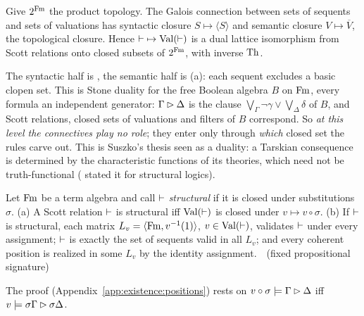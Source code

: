 \begin{theorem}\label{thm:existence:duality}
Give $2^{\mathrm{Fm}}$ the product topology. The Galois connection between sets of sequents and sets of valuations has syntactic closure $S\mapsto\langle S\rangle$ and semantic closure $V\mapsto\overline V$, the topological closure. Hence ${\vdash}\mapsto\mathrm{Val}(\vdash)$ is a dual lattice isomorphism from Scott relations onto closed subsets of $2^{\mathrm{Fm}}$, with inverse $\mathrm{Th}$.
\hfill{}\ 
\end{theorem}

The syntactic half is , the semantic half is (a): each sequent excludes a basic clopen set. This is Stone duality \citep{stone1936theory} for the free Boolean algebra $B$ on $\mathrm{Fm}$, every formula an independent generator: $\Gamma\rhd\Delta$ is the clause $\bigvee_\Gamma\neg\gamma\vee\bigvee_\Delta\delta$ of $B$, and Scott relations, closed sets of valuations and filters of $B$ correspond. So \emph{at this level the connectives play no role}; they enter only through \emph{which} closed set the rules carve out. This is Suszko's thesis seen as a duality: a Tarskian consequence is determined by the characteristic functions of its theories, which need not be truth-functional (\citealt{suszko1977fregean} stated it for structural logics).

\begin{theorem}\label{thm:existence:structural}
Let $\mathrm{Fm}$ be a term algebra and call ${\vdash}$ \emph{structural} if it is closed under substitutions $\sigma$. \textup{(a)} A Scott relation ${\vdash}$ is structural iff $\mathrm{Val}(\vdash)$ is closed under $v\mapsto v\circ\sigma$. \textup{(b)} If ${\vdash}$ is structural, each matrix $L_v=\langle\mathrm{Fm},v^{-1}(1)\rangle$, $v\in\mathrm{Val}(\vdash)$, validates ${\vdash}$ under every assignment; ${\vdash}$ is exactly the set of sequents valid in all $L_v$; and every coherent position is realized in some $L_v$ by the identity assignment.
\hfill{}\ \,(fixed propositional signature)
\end{theorem}

The proof (Appendix~\ref{app:existence:positions}) rests on $v\circ\sigma\models\Gamma\rhd\Delta$ iff $v\models\sigma\Gamma\rhd\sigma\Delta$.

